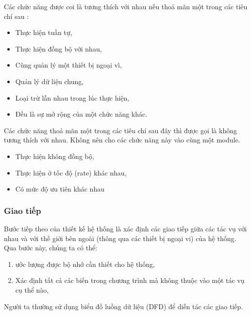                 Các chức năng được coi là tương thích với nhau nếu thoả mãn một
                trong các tiêu chí sau \cite{EmbSysWD}:
                \begin{itemize}
                    \item Thực hiện tuần tự,
                    \item Thực hiện đồng bộ với nhau,
                    \item Cùng quản lý một thiết bị ngoại vì,
                    \item Quản lý dữ liệu chung,
                    \item Loại trừ lẫn nhau trong lúc thực hiện,
                    \item Đều là sự mở rộng của một chức năng khác.
                \end{itemize}

                Các chức năng thoả mãn một trong các tiêu chí sau đây thì được
                gọi là không tương thích với nhau. Không nên cho các chức năng
                này vào cùng một module.
                \begin{itemize}
                    \item Thực hiện không đồng bộ,
                    \item Thực hiện ở tốc độ (rate) khác nhau,
                    \item Có mức độ ưu tiên khác nhau
                \end{itemize}

            \subsubsection{Giao tiếp}
                Bước tiếp theo của thiết kế hệ thống là xác định các giao tiếp
                giữa các tác vụ với nhau và với thế giới bên ngoài (thông qua
                các thiết bị ngoại vi) của hệ thống. Qua bước này, chúng ta có
                thể:
                \begin{enumerate}
                    \item ước lượng được bộ nhớ cần thiết cho hệ thống,
                    \item Xác định tất cả các biến trong chương trình mà không
                        thuộc vào một tác vụ cụ thể nào,
                \end{enumerate}

                Người ta thường sử dụng biểu đồ luồng dữ liệu (DFD) để diễn tác
                các giao tiếp.

